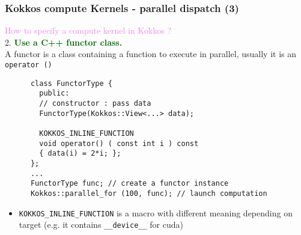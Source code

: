 \begin{frame}[fragile=singleslide]
  \frametitle{Kokkos compute Kernels - parallel dispatch (3)}

  {\large \textcolor{violet}{How to specify a compute kernel in Kokkos ?}}\\
  {\large 2. \textcolor{darkgreen}{\textbf{Use a C++ functor class.}}}\\
  A functor is a class containing a function to execute in parallel, usually it is an \texttt{operator ()}
  {\small
    \begin{verbatim}
      class FunctorType {
        public:
        // constructor : pass data
        FunctorType(Kokkos::View<...> data);
        
        KOKKOS_INLINE_FUNCTION
        void operator() ( const int i ) const
        { data(i) = 2*i; };
      };
      ...
      FunctorType func; // create a functor instance
      Kokkos::parallel_for (100, func); // launch computation
    \end{verbatim}
    \begin{itemize}
    \item \texttt{KOKKOS\_INLINE\_FUNCTION} is a macro with different meaning depending on target (e.g. it contains \texttt{\_\_device\_\_} for cuda)
    \end{itemize}
  }

\end{frame}

